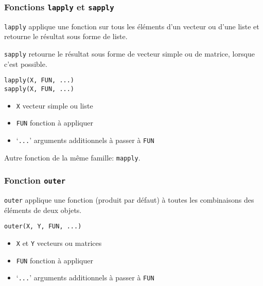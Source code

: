 \begin{frame}[fragile=singleslide]
  \frametitle{Fonctions \texttt{lapply} et \texttt{sapply}}

  \texttt{lapply} applique une fonction sur tous les éléments d'un
  \alert{vecteur} ou d'une \alert{liste} et retourne le résultat sous
  forme de liste.

  \texttt{sapply} retourne le résultat sous forme de vecteur simple ou
  de matrice, lorsque c'est possible.
  \begin{Schunk}
\begin{lstlisting}
lapply(X, FUN, ...)
sapply(X, FUN, ...)
\end{lstlisting}
  \end{Schunk}
  \begin{itemize}
  \item \texttt{X} vecteur simple ou liste
  \item \texttt{FUN} fonction à appliquer
  \item `\texttt{...}' arguments additionnels à passer à \texttt{FUN}
  \end{itemize}

  Autre fonction de la même famille: \texttt{mapply}.
\end{frame}

\begin{frame}[fragile]
  \frametitle{Fonction \texttt{outer}}

  \texttt{outer} applique une fonction (produit par défaut) à
  \alert{toutes les combinaisons} des éléments de deux objets.

  \begin{Schunk}
\begin{lstlisting}
outer(X, Y, FUN, ...)
\end{lstlisting}
  \end{Schunk}
  \begin{itemize}
  \item \texttt{X} et \texttt{Y} vecteurs ou matrices
  \item \texttt{FUN} fonction à appliquer
  \item `\texttt{...}' arguments additionnels à passer à \texttt{FUN}
  \end{itemize}

  \pause
\end{frame}

